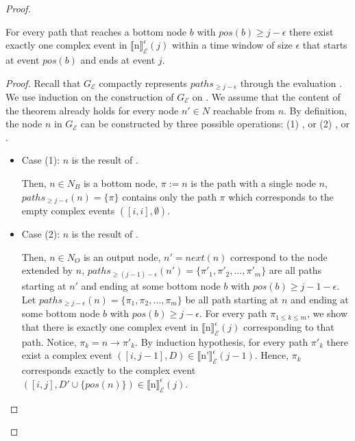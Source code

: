 \begin{proof}

\begin{lemma}\label{lemma:bijection:1}
  For every path that reaches a bottom node $b$ with $pos(b) \ge j - \epsilon$ there exist exactly one complex event in ${\llbracket \text{n} \rrbracket}^{\epsilon}_{\mathcal{E}}(j)$ within a time window of size $\epsilon$ that starts at event $pos(b)$ and ends at event $j$.
\end{lemma}

\begin{proof}
  Recall that $G_{\mathcal{E}}$ compactly represents $paths_{\ge j - \epsilon}$ through the evaluation . We use induction on the construction of $G_{\mathcal{E}}$ on . We assume that the content of the theorem already holds for every node $n' \in N$ reachable from $n$. By definition, the node $n$ in $G_{\mathcal{E}}$ can be constructed by three possible operations: (1) , or (2) , or .
\begin{itemize}
  \item Case (1): $n$ is the result of .

    Then, $n \in N_{B}$ is a bottom node, $\pi := n$ is the path with a single node $n$, $paths_{\ge j - \epsilon}(n) = \{ \pi \}$ contains only the path $\pi$ which corresponds to the empty complex events $([i, i], \emptyset)$.

  \item Case (2): $n$ is the result of .

    Then, $n \in N_{O}$ is an output node, $n' = next(n)$ correspond to the node extended by $n$, $paths_{\ge (j - 1) - \epsilon}(n') = \{ \pi'_{1},\pi'_{2},\ldots, \pi'_{m} \}$ are all paths starting at $n'$ and ending at some bottom node $b$ with $pos(b) \ge j - 1 - \epsilon$. Let $paths_{\ge j - \epsilon}(n) = \{ \pi_{1}, \pi_{2},\ldots, \pi_{m} \}$ be all path starting at $n$ and ending at some bottom node $b$ with $pos(b) \ge j - \epsilon$. For every path $\pi_{1 \le k \le m}$, we show that there is exactly one complex event in ${\llbracket \text{n} \rrbracket}^{\epsilon}_{\mathcal{E}}(j)$ corresponding to that path. Notice, $\pi_{k} = n \rightarrow \pi'_{k}$. By induction hypothesis, for every path $\pi'_{k}$ there exist a complex event $([i, j-1], D) \in {\llbracket \text{n'} \rrbracket}^{\epsilon}_{\mathcal{E}}(j-1)$. Hence, $\pi_{k}$ corresponds exactly to the complex event $([i, j], D' \cup \{pos(n)\}) \in {\llbracket \text{n} \rrbracket}^{\epsilon}_{\mathcal{E}}(j)$.


\end{itemize}
\end{proof}
\end{proof}

